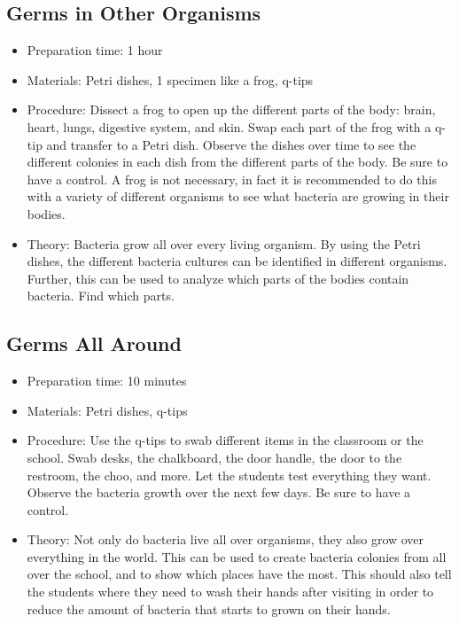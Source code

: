 \subsection{Germs in Other Organisms}
\begin{itemize}
\item{Preparation time: 1 hour}
\item{Materials: Petri dishes, 1 specimen like a frog, q-tips}
\item{Procedure: Dissect a frog to open up the different parts of the body: brain, heart, lungs, digestive system, and skin. Swap each part of the frog with a q-tip and transfer to a Petri dish. Observe the dishes over time to see the different colonies in each dish from the different parts of the body. Be sure to have a control. A frog is not necessary, in fact it is recommended to do this with a variety of different organisms to see what bacteria are growing in their bodies.}
\item{Theory: Bacteria grow all over every living organism. By using the Petri dishes, the different bacteria cultures can be identified in different organisms. Further, this can be used to analyze which parts of the bodies contain bacteria. Find which parts.}
\end{itemize}

\subsection{Germs All Around}
\begin{itemize}
\item{Preparation time: 10 minutes}
\item{Materials: Petri dishes, q-tips}
\item{Procedure: Use the q-tips to swab different items in the classroom or the school. Swab desks, the chalkboard, the door handle, the door to the restroom, the choo, and more. Let the students test everything they want. Observe the bacteria growth over the next few days. Be sure to have a control.}
\item{Theory: Not only do bacteria live all over organisms, they also grow over everything in the world. This can be used to create bacteria colonies from all over the school, and to show which places have the most. This should also tell the students where they need to wash their hands after visiting in order to reduce the amount of bacteria that starts to grown on their hands.}
\end{itemize}

